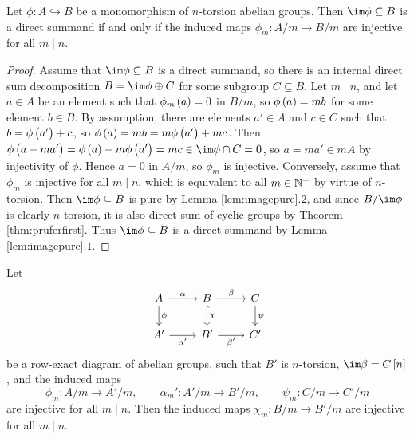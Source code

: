 \begin{lemma}
\label{lem:summandinjective}
Let $ \phi : A \hookrightarrow B $ be a monomorphism of $ n $-torsion abelian groups. Then $ \im \phi \subseteq B $ is a direct summand if and only if the induced maps $ \phi_m : A / m \to B / m $ are injective for all $ m \mid n $.
\end{lemma}

\begin{proof}
Assume that $ \im \phi \subseteq B $ is a direct summand, so there is an internal direct sum decomposition $ B = \im \phi \oplus C $ for some subgroup $ C \subseteq B $. Let $ m \mid n $, and let $ a \in A $ be an element such that $ \phi_m\br{a} = 0 $ in $ B / m $, so $ \phi\br{a} = mb $ for some element $ b \in B $. By assumption, there are elements $ a' \in A $ and $ c \in C $ such that $ b = \phi\br{a'} + c $, so $ \phi\br{a} = mb = m\phi\br{a'} + mc $. Then $ \phi\br{a - ma'} = \phi\br{a} - m\phi\br{a'} = mc \in \im \phi \cap C = 0 $, so $ a = ma' \in mA $ by injectivity of $ \phi $. Hence $ a = 0 $ in $ A / m $, so $ \phi_m $ is injective. Conversely, assume that $ \phi_m $ is injective for all $ m \mid n $, which is equivalent to all $ m \in \mathbb{N}^+ $ by virtue of $ n $-torsion. Then $ \im \phi \subseteq B $ is pure by Lemma \ref{lem:imagepure}.$ 2 $, and since $ B / \im \phi $ is clearly $ n $-torsion, it is also direct sum of cyclic groups by Theorem \ref{thm:pruferfirst}. Thus $ \im \phi \subseteq B $ is a direct summand by Lemma \ref{lem:imagepure}.$ 1 $.
\end{proof}

\begin{lemma}
\label{lem:diagraminjective}
Let
$$
\begin{tikzcd}
A \arrow{r}{\alpha} \arrow{d}{\phi} & B \arrow{r}{\beta} \arrow[hookrightarrow]{d}{\chi} & C \arrow{d}{\psi} \\
A' \arrow{r}[swap]{\alpha'} & B' \arrow{r}[swap]{\beta'} & C'
\end{tikzcd}
$$
be a row-exact diagram of abelian groups, such that $ B' $ is $ n $-torsion, $ \im \beta = C\sbr{n} $, and the induced maps
$$ \phi_m : A / m \to A' / m, \qquad \alpha_m' : A' / m \to B' / m, \qquad \psi_m : C / m \to C' / m $$
are injective for all $ m \mid n $. Then the induced maps $ \chi_m : B / m \to B' / m $ are injective for all $ m \mid n $.
\end{lemma}

